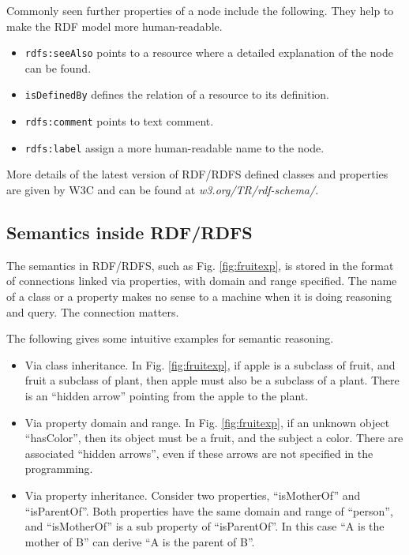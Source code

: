 Commonly seen further properties of a node include the following. They help to make the RDF model more human-readable.
\begin{itemize}
	\item \verb|rdfs:seeAlso| points to a resource where a detailed explanation of the node can be found.
	\item \verb|isDefinedBy| defines the relation of a resource to its definition.
	\item \verb|rdfs:comment| points to text comment.
	\item \verb|rdfs:label| assign a more human-readable name to the node.
\end{itemize}

More details of the latest version of RDF/RDFS defined classes and properties are given by W3C and can be found at \textit{w3.org/TR/rdf-schema/}.

\subsection{Semantics inside RDF/RDFS}

The semantics in RDF/RDFS, such as Fig. \ref{fig:fruitexp}, is stored in the format of connections linked via properties, with domain and range specified. The name of a class or a property makes no sense to a machine when it is doing reasoning and query. The connection matters. 

The following gives some intuitive examples for semantic reasoning.
\begin{itemize}
	\item Via class inheritance. In Fig. \ref{fig:fruitexp}, if apple is a subclass of fruit, and fruit a subclass of plant, then apple must also be a subclass of a plant. There is an ``hidden arrow'' pointing from the apple to the plant.
	\item Via property domain and range. In Fig. \ref{fig:fruitexp}, if an unknown object ``hasColor'', then its object must be a fruit, and the subject a color. There are associated ``hidden arrows'', even if these arrows are not specified in the programming. 
	\item Via property inheritance. Consider two properties, ``isMotherOf'' and ``isParentOf''. Both properties have the same domain and range of ``person'', and ``isMotherOf'' is a sub property of ``isParentOf''. In this case ``A is the mother of B'' can derive ``A is the parent of B''. 
\end{itemize}

